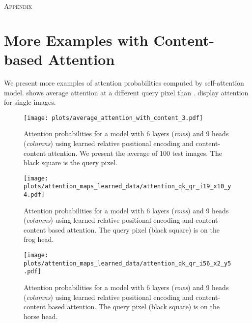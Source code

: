 \documentclass{article} \usepackage{iclr2020_conference,times}
\begin{document}
\newpage

\appendix

{\LARGE \textsc{Appendix}}





\section{More Examples with Content-based Attention}
\label{ssec:appendix_content}

We present more examples of attention probabilities computed by self-attention model.  shows average attention at a different query pixel than .  display attention for single images.
\vspace{-1em}
\begin{figure}[H]
\centering
  \texttt{[image: plots/average\_attention\_with\_content\_3.pdf]}
  \vspace{-.5em}
  \caption{Attention probabilities for a model with 6 layers (\emph{rows}) and 9 heads (\emph{columns}) using learned relative positional encoding and content-content attention.
  We present the average of 100 test images.
  The black square is the query pixel.}
  \label{fig:average_attention_3_3}
\end{figure}


\begin{figure}[H]
\centering
  \vspace{-1em}
  \texttt{[image: plots/attention\_maps\_learned\_data/attention\_qk\_qr\_i19\_x10\_y4.pdf]}
  \vspace{-.5em}
  \caption{Attention probabilities for a model with 6 layers (\emph{rows}) and 9 heads (\emph{columns}) using learned relative positional encoding and content-content based attention. The query pixel (black square) is on the frog head.}
  \label{fig:extra_data_3}
\end{figure}

\begin{figure}[H]
\centering
  \texttt{[image: plots/attention\_maps\_learned\_data/attention\_qk\_qr\_i56\_x2\_y5.pdf]}
  \vspace{-.5em}
  \caption{Attention probabilities for a model with 6 layers (\emph{rows}) and 9 heads (\emph{columns}) using learned relative positional encoding and content-content based attention. The query pixel (black square) is on the horse head.}
  \label{fig:extra_data_1}
\end{figure}
\end{document}
